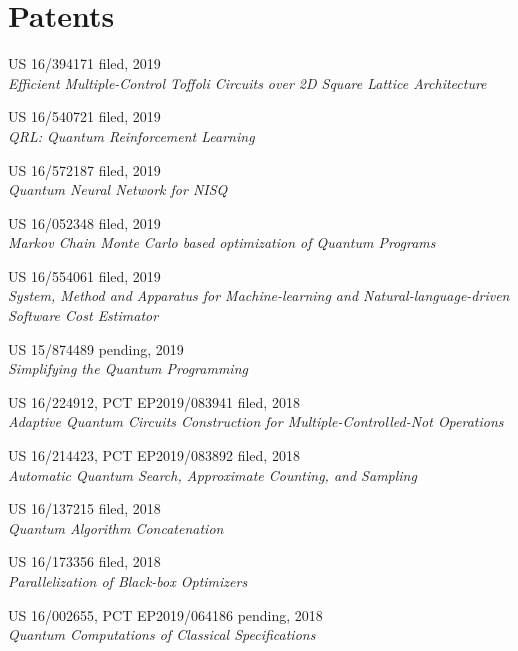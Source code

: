 \section{\sc Patents}

{\sc US 16/394171} \hfill {\sc filed}, 2019\\
\emph{Efficient Multiple-Control Toffoli Circuits over 2D Square Lattice Architecture}

{\sc US 16/540721} \hfill {\sc filed}, 2019\\
\emph{QRL: Quantum Reinforcement Learning}

{\sc US 16/572187} \hfill {\sc filed}, 2019\\
\emph{Quantum Neural Network for NISQ}

{\sc US 16/052348} \hfill {\sc filed}, 2019\\
\emph{Markov Chain Monte Carlo based optimization of Quantum Programs}

{\sc US 16/554061} \hfill {\sc filed}, 2019\\
\emph{System, Method and Apparatus for Machine-learning and Natural-language-driven \\Software Cost Estimator}

{\sc US 15/874489} \hfill {\sc pending}, 2019\\
\emph{Simplifying the Quantum Programming}

{\sc US 16/224912, PCT EP2019/083941} \hfill {\sc filed}, 2018\\
\emph{Adaptive Quantum Circuits Construction for Multiple-Controlled-Not Operations}

{\sc US 16/214423, PCT EP2019/083892} \hfill {\sc filed}, 2018\\
\emph{Automatic Quantum Search, Approximate Counting, and Sampling}

{\sc US 16/137215} \hfill {\sc filed}, 2018\\
\emph{Quantum Algorithm Concatenation}

{\sc US 16/173356} \hfill {\sc filed}, 2018\\
\emph{Parallelization of Black-box Optimizers}

{\sc US 16/002655, PCT EP2019/064186} \hfill {\sc pending}, 2018\\
\emph{Quantum Computations of Classical Specifications}

